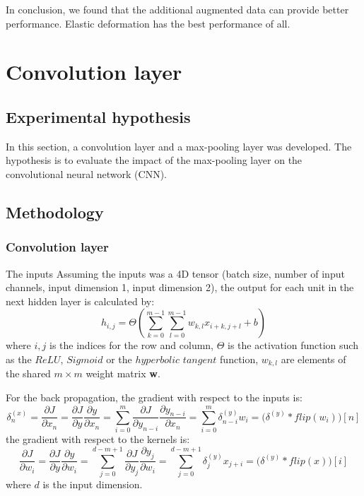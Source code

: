 \documentclass[11pt]{article}
\begin{document}
In conclusion, we found that the additional augmented data can provide better performance. Elastic deformation has the best performance of all. 

\newpage

\section{Convolution layer}
\subsection{Experimental hypothesis}
In this section, a convolution layer and a max-pooling layer was developed. The hypothesis is to evaluate the impact of the max-pooling layer on the convolutional neural network (CNN).
\subsection{Methodology}
\subsubsection{Convolution layer}
The inputs Assuming the inputs was a 4D tensor (batch size, number of input channels, input dimension 1, input dimension 2), the output for each unit in the next hidden layer is calculated by:
\begin{equation}
	h_{i,j} = \Theta(\sum_{k=0}^{m-1}\sum_{l=0}^{m-1}w_{k,l}x_{i+k,j+l}+b)
\end{equation}
where $i,j$ is the indices for the row and column, $\Theta$ is the activation function such as the $ReLU$, $Sigmoid$ or the $hyperbolic$ $tangent$ function, $w_{k,l}$ are elements of the shared $m \times m$ weight matrix {\bf w}.

For the back propagation, the gradient with respect to the inputs is:
\begin{equation}
	\delta_n^{(x)} = \frac{\partial J}{\partial x_n} = \frac{\partial J}{\partial y}\frac{\partial y}{\partial x_n} = \sum_{i=0}^{m} \frac{\partial J}{\partial y_{n-i}}\frac{\partial y_{n-i}}{\partial x_n} = \sum_{i=0}^{m}\delta_{n-i}^{(y)}w_i = \Big(\delta^{(y)}*flip(w_i)\Big) [n]
\end{equation}
the gradient with respect to the kernels is:
\begin{equation}
\frac{\partial J}{\partial w_i} = \frac{\partial J}{\partial y}\frac{\partial y}{\partial w_i} = \sum _{j=0}^{d-m+1} \frac{\partial J}{\partial y_{j}}\frac{\partial y_{j}}{\partial w_i} = \sum_{j=0}^{d-m+1}\delta_j^{(y)}x_{j+i} = \Big(\delta^{(y)} * flip(x) \Big)[i]
\end{equation}
where $d$ is the input dimension. 
\end{document}

